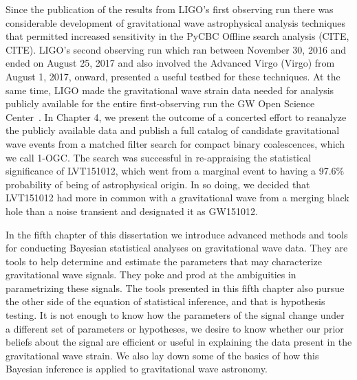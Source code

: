 Since the publication of the results from LIGO's first observing run there was considerable development of gravitational wave astrophysical analysis techniques that permitted increased sensitivity in the PyCBC Offline search analysis (CITE, CITE). LIGO's second observing run which ran between November 30, 2016 and ended on August 25, 2017 and also involved the Advanced Virgo (Virgo) from August 1, 2017, onward, presented a useful testbed for these techniques. At the same time, LIGO made the gravitational wave strain data needed for analysis publicly available for the entire first-observing run the GW Open Science Center~\citep{Vallisneri:2014vxa,gw170817-losc}. In Chapter 4, we present the outcome of a concerted effort to reanalyze the publicly available data and publish a full catalog of candidate gravitational wave events from a matched filter search for compact binary coalescences, which we call 1-OGC. The search was successful in re-appraising the statistical significance of LVT151012, which went from a marginal event to having a 97.6$\%$ probability of being of astrophysical origin. In so doing, we decided that LVT151012 had more in common with a gravitational wave from a merging black hole than a noise transient and designated it as GW151012.


In the fifth chapter of this dissertation we introduce advanced methods and tools for conducting Bayesian statistical analyses on gravitational wave data. They are tools to help determine and estimate the parameters that may characterize gravitational wave signals. They poke and prod at the ambiguities in parametrizing these signals. The tools presented in this fifth chapter also pursue the other side of the equation of statistical inference, and that is hypothesis testing. It is not enough to know how the parameters of the signal change under a different set of parameters or hypotheses, we desire to know whether our prior beliefs about the signal are efficient or useful in explaining the data present in the gravitational wave strain. We also lay down some of the basics of how this Bayesian inference is applied to gravitational wave astronomy.

